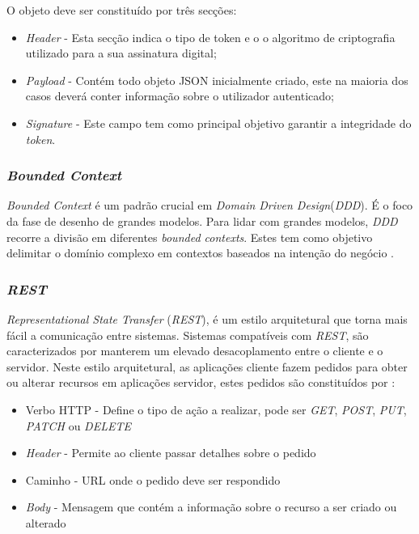 O objeto deve ser constituído por três secções:
\begin{itemize}
    \item \emph{Header} - Esta secção indica o tipo de token e o o algoritmo de criptografia utilizado para a sua assinatura digital;
    \item \emph{Payload} - Contém todo objeto JSON inicialmente criado, este na maioria dos casos deverá conter informação sobre o utilizador autenticado;
    \item \emph{Signature} - Este campo tem como principal objetivo garantir a integridade do \emph{token}.
\end{itemize}

\subsubsection{\emph{Bounded Context}} \label{subsubsection:bounded:context}
\emph{Bounded Context} é um padrão crucial em \emph{Domain Driven Design}(\emph{DDD}\label{sym:DDD}). É o foco da fase de desenho de grandes modelos. Para lidar com grandes modelos, \emph{DDD} recorre a divisão em diferentes \emph{bounded contexts}. Estes tem como objetivo delimitar o domínio complexo em contextos baseados na intenção do negócio \cite{bounded_context}.

\subsubsection{\emph{REST}}
\emph{Representational State Transfer} (\emph{REST}\label{sym:REST}), é um estilo arquitetural que torna mais fácil a comunicação entre sistemas. Sistemas compatíveis com \emph{REST}, são caracterizados por manterem um elevado desacoplamento entre o cliente e o servidor.
Neste estilo arquitetural, as aplicações cliente fazem pedidos para obter ou alterar recursos em aplicações servidor, estes pedidos são constituídos por \cite{rest}:
\begin{itemize}
    \item Verbo HTTP - Define o tipo de ação a realizar, pode ser \emph{GET}, \emph{POST}, \emph{PUT}, \emph{PATCH} ou \emph{DELETE}
    \item \emph{Header} - Permite ao cliente passar detalhes sobre o pedido
    \item Caminho - URL onde o pedido deve ser respondido
    \item \emph{Body} - Mensagem que contém a informação sobre o recurso a ser criado ou alterado
\end{itemize}

